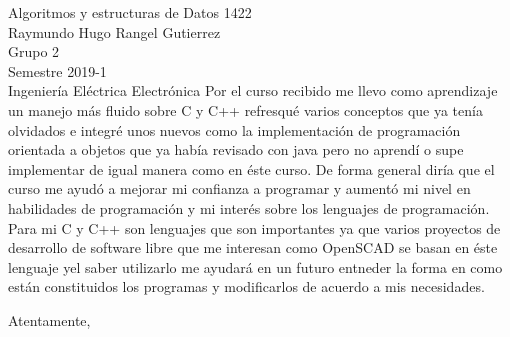 \documentclass[10pt]{letter} %
\begin{document}
\begin{letter}{Algoritmos y estructuras de Datos 1422 \\
		Raymundo Hugo Rangel Gutierrez \\ Grupo 2 \\ Semestre 2019-1 \\ Ingeniería Eléctrica Electrónica  }
Por el curso recibido me llevo como aprendizaje un manejo más fluido sobre C y C++ refresqué varios conceptos que ya tenía olvidados e integré unos nuevos como la implementación de programación orientada a objetos que ya había revisado con java pero no aprendí o supe implementar de igual manera como en éste curso. De forma general diría que el curso me ayudó a mejorar mi confianza a programar y aumentó mi nivel en habilidades de programación y mi interés sobre los lenguajes de programación.\\

 Para mi C y C++ son lenguajes que son importantes ya que varios proyectos de desarrollo de software libre que me interesan como OpenSCAD se basan en éste lenguaje yel saber utilizarlo me ayudará en un futuro entneder la forma en como están constituidos los programas y modificarlos de acuerdo a mis necesidades.\\

 

 

\vspace{2\parskip} %
\closing{Atentamente,}
\vspace{2\parskip} %




\end{letter}
 
\end{document}
